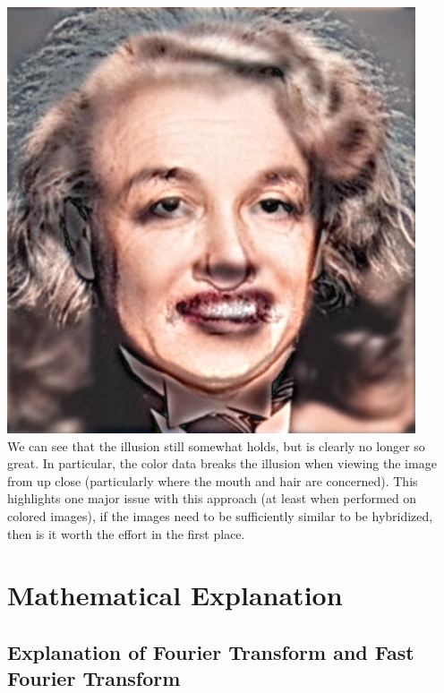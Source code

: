 \documentclass[notitlepage]{article}
\begin{document}
\includegraphics[width=4.75in]{../samples/images/rgb_einstein_monroe.png}
\\
We can see that the illusion still somewhat holds, but is clearly no longer so great. In particular,
the color data breaks the illusion when viewing the image from up close (particularly where the mouth
and hair are concerned). This highlights one major issue with this approach (at least when performed on colored images),
if the images need to be sufficiently similar to be hybridized, then is it worth the effort in the first place.

\section{Mathematical Explanation}

\subsection{Explanation of Fourier Transform and Fast Fourier Transform}
\end{document}
